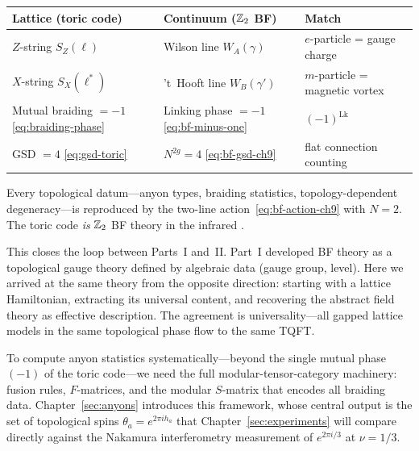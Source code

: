 \begin{center}
\renewcommand{\arraystretch}{1.3}
\begin{tabular}{lll}
\hline
\textbf{Lattice (toric code)} & \textbf{Continuum ($\mathbb{Z}_2$ BF)} & \textbf{Match} \\
\hline
$Z$-string $S_Z(\ell)$ & Wilson line $W_A(\gamma)$ & $e$-particle = gauge charge \\
$X$-string $S_X(\ell^*)$ & 't~Hooft line $W_B(\gamma')$ & $m$-particle = magnetic vortex \\
Mutual braiding $= -1$ \eqref{eq:braiding-phase} & Linking phase $= -1$ \eqref{eq:bf-minus-one} & $(-1)^{\mathrm{Lk}}$ \\
GSD $= 4$ \eqref{eq:gsd-toric} & $N^{2g} = 4$ \eqref{eq:bf-gsd-ch9} & flat connection counting \\
\hline
\end{tabular}
\end{center}

\noindent Every topological datum---anyon types, braiding statistics, topology-dependent degeneracy---is reproduced by the two-line action~\eqref{eq:bf-action-ch9} with $N = 2$.  The toric code \emph{is} $\mathbb{Z}_2$ BF theory in the infrared \cite{Kitaev2003FaultTolerant}.

\begin{remark}\label{rmk:bf-roundtrip}
This closes the loop between Parts~I and~II.  Part~I developed BF theory as a topological gauge theory defined by algebraic data (gauge group, level).  Here we arrived at the same theory from the opposite direction: starting with a lattice Hamiltonian, extracting its universal content, and recovering the abstract field theory as effective description.  The agreement is universality---all gapped lattice models in the same topological phase flow to the same TQFT.
\end{remark}

\medskip

\noindent To compute anyon statistics systematically---beyond the single mutual phase $(-1)$ of the toric code---we need the full modular-tensor-category machinery: fusion rules, $F$-matrices, and the modular $S$-matrix that encodes all braiding data.  Chapter~\ref{sec:anyons} introduces this framework, whose central output is the set of topological spins $\theta_a = e^{2\pi i h_a}$ that Chapter~\ref{sec:experiments} will compare directly against the Nakamura interferometry measurement of $e^{2\pi i/3}$ at $\nu = 1/3$.
